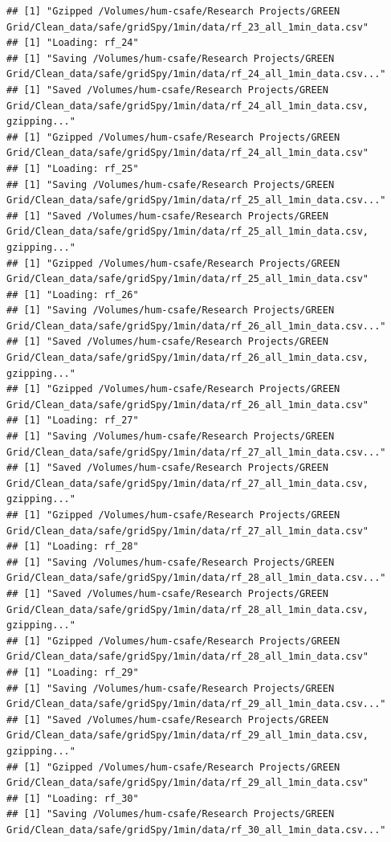 \documentclass[]{article}
\begin{document}
\begin{verbatim}
## [1] "Gzipped /Volumes/hum-csafe/Research Projects/GREEN Grid/Clean_data/safe/gridSpy/1min/data/rf_23_all_1min_data.csv"
## [1] "Loading: rf_24"
## [1] "Saving /Volumes/hum-csafe/Research Projects/GREEN Grid/Clean_data/safe/gridSpy/1min/data/rf_24_all_1min_data.csv..."
## [1] "Saved /Volumes/hum-csafe/Research Projects/GREEN Grid/Clean_data/safe/gridSpy/1min/data/rf_24_all_1min_data.csv, gzipping..."
## [1] "Gzipped /Volumes/hum-csafe/Research Projects/GREEN Grid/Clean_data/safe/gridSpy/1min/data/rf_24_all_1min_data.csv"
## [1] "Loading: rf_25"
## [1] "Saving /Volumes/hum-csafe/Research Projects/GREEN Grid/Clean_data/safe/gridSpy/1min/data/rf_25_all_1min_data.csv..."
## [1] "Saved /Volumes/hum-csafe/Research Projects/GREEN Grid/Clean_data/safe/gridSpy/1min/data/rf_25_all_1min_data.csv, gzipping..."
## [1] "Gzipped /Volumes/hum-csafe/Research Projects/GREEN Grid/Clean_data/safe/gridSpy/1min/data/rf_25_all_1min_data.csv"
## [1] "Loading: rf_26"
## [1] "Saving /Volumes/hum-csafe/Research Projects/GREEN Grid/Clean_data/safe/gridSpy/1min/data/rf_26_all_1min_data.csv..."
## [1] "Saved /Volumes/hum-csafe/Research Projects/GREEN Grid/Clean_data/safe/gridSpy/1min/data/rf_26_all_1min_data.csv, gzipping..."
## [1] "Gzipped /Volumes/hum-csafe/Research Projects/GREEN Grid/Clean_data/safe/gridSpy/1min/data/rf_26_all_1min_data.csv"
## [1] "Loading: rf_27"
## [1] "Saving /Volumes/hum-csafe/Research Projects/GREEN Grid/Clean_data/safe/gridSpy/1min/data/rf_27_all_1min_data.csv..."
## [1] "Saved /Volumes/hum-csafe/Research Projects/GREEN Grid/Clean_data/safe/gridSpy/1min/data/rf_27_all_1min_data.csv, gzipping..."
## [1] "Gzipped /Volumes/hum-csafe/Research Projects/GREEN Grid/Clean_data/safe/gridSpy/1min/data/rf_27_all_1min_data.csv"
## [1] "Loading: rf_28"
## [1] "Saving /Volumes/hum-csafe/Research Projects/GREEN Grid/Clean_data/safe/gridSpy/1min/data/rf_28_all_1min_data.csv..."
## [1] "Saved /Volumes/hum-csafe/Research Projects/GREEN Grid/Clean_data/safe/gridSpy/1min/data/rf_28_all_1min_data.csv, gzipping..."
## [1] "Gzipped /Volumes/hum-csafe/Research Projects/GREEN Grid/Clean_data/safe/gridSpy/1min/data/rf_28_all_1min_data.csv"
## [1] "Loading: rf_29"
## [1] "Saving /Volumes/hum-csafe/Research Projects/GREEN Grid/Clean_data/safe/gridSpy/1min/data/rf_29_all_1min_data.csv..."
## [1] "Saved /Volumes/hum-csafe/Research Projects/GREEN Grid/Clean_data/safe/gridSpy/1min/data/rf_29_all_1min_data.csv, gzipping..."
## [1] "Gzipped /Volumes/hum-csafe/Research Projects/GREEN Grid/Clean_data/safe/gridSpy/1min/data/rf_29_all_1min_data.csv"
## [1] "Loading: rf_30"
## [1] "Saving /Volumes/hum-csafe/Research Projects/GREEN Grid/Clean_data/safe/gridSpy/1min/data/rf_30_all_1min_data.csv..."

\end{verbatim}
\end{document}
